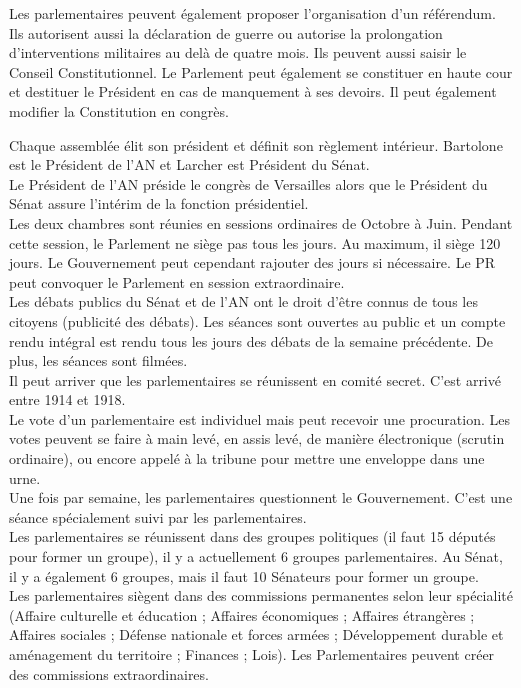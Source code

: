 \documentclass[12pt, a4paper, openany]{book}
\begin{document}
Les parlementaires peuvent également proposer l'organisation d'un référendum. Ils autorisent aussi la déclaration de guerre ou autorise la prolongation d'interventions militaires au delà de quatre mois. Ils peuvent aussi saisir le Conseil Constitutionnel. Le Parlement peut également se constituer en haute cour et destituer le Président en cas de manquement à ses devoirs. Il peut également modifier la Constitution en congrès.


Chaque assemblée élit son président et définit son règlement intérieur. Bartolone est le Président de l'AN et Larcher est Président du Sénat. \\
Le Président de l'AN préside le congrès de Versailles alors que le Président du Sénat assure l'intérim de la fonction présidentiel. \\
Les deux chambres sont réunies en sessions ordinaires de Octobre à Juin. Pendant cette session, le Parlement ne siège pas tous les jours. Au maximum, il siège 120 jours. Le Gouvernement peut cependant rajouter des jours si nécessaire. Le PR peut convoquer le Parlement en session extraordinaire. \\
Les débats publics du Sénat et de l'AN ont le droit d'être connus de tous les citoyens (publicité des débats). Les séances sont ouvertes au public et un compte rendu intégral est rendu tous les jours des débats de la semaine précédente. De plus, les séances sont filmées. \\
Il peut arriver que les parlementaires se réunissent en comité secret. C'est arrivé entre 1914 et 1918. \\
Le vote d'un parlementaire est individuel mais peut recevoir une procuration. Les votes peuvent se faire à main levé, en assis levé, de manière électronique (scrutin ordinaire), ou encore appelé à la tribune pour mettre une enveloppe dans une urne. \\
Une fois par semaine, les parlementaires questionnent le Gouvernement. C'est une séance spécialement suivi par les parlementaires. \\
Les parlementaires se réunissent dans des groupes politiques (il faut 15 députés pour former un groupe), il y a actuellement 6 groupes parlementaires. Au Sénat, il y a également 6 groupes, mais il faut 10 Sénateurs pour former un groupe. \\
Les parlementaires siègent dans des commissions permanentes selon leur spécialité (Affaire culturelle et éducation ; Affaires économiques ; Affaires étrangères ; Affaires sociales ; Défense nationale et forces armées ; Développement durable et aménagement du territoire ; Finances ; Lois). Les Parlementaires peuvent créer des commissions extraordinaires.
\end{document}
